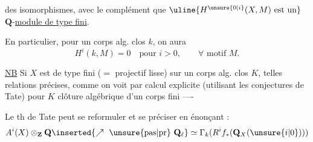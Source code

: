  des isomorphismes, avec le complément que $\uline{H^{\unsure{0|i}}(X,M)\text{ est un}}$ $\mathbf{Q}$-\uline{module de type fini}.


En particulier, pour un corps alg. clos $k$, on aura
\[
H^i(k,M)=0\quad\text{pour }i>0,\qquad \forall\text{ motif }M.
\]

\uline{NB} Si $X$ est de type fini ($=$ projectif lisse) sur un corps alg. clos $K$,  telles relations précises, comme on voit par calcul explicite (utilisant les conjectures de Tate) pour $K$ clôture algébrique d'un corps fini ----

Le th de Tate peut se reformuler et se préciser en énonçant :
\[
A^i(X)\otimes_{\mathbf{Z}}\mathbf{Q}\inserted{\nearrow\ \unsure{\text{pas}|\text{pr}}\ \mathbf{Q}_\ell}\simeq \Gamma_k(R^i f_*(\mathbf{Q}_X(\unsure{i|0})))
\]
